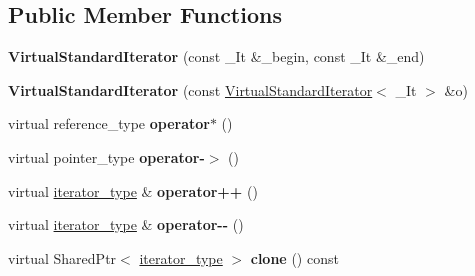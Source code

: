\subsection*{Public Member Functions}
\begin{DoxyCompactItemize}
\item 
{\bfseries Virtual\+Standard\+Iterator} (const \+\_\+\+It \&\+\_\+begin, const \+\_\+\+It \&\+\_\+end)\hypertarget{classAudio_1_1VirtualStandardIterator_a237655dc55ce904e05ee19234c190e04}{}\label{classAudio_1_1VirtualStandardIterator_a237655dc55ce904e05ee19234c190e04}

\item 
{\bfseries Virtual\+Standard\+Iterator} (const \hyperlink{classAudio_1_1VirtualStandardIterator}{Virtual\+Standard\+Iterator}$<$ \+\_\+\+It $>$ \&o)\hypertarget{classAudio_1_1VirtualStandardIterator_a5cd290b2dc2c82f4f6ab9119bc964a4d}{}\label{classAudio_1_1VirtualStandardIterator_a5cd290b2dc2c82f4f6ab9119bc964a4d}

\item 
virtual reference\+\_\+type {\bfseries operator$\ast$} ()\hypertarget{classAudio_1_1VirtualStandardIterator_af8d67f959d9957d33e445b3fed16312b}{}\label{classAudio_1_1VirtualStandardIterator_af8d67f959d9957d33e445b3fed16312b}

\item 
virtual pointer\+\_\+type {\bfseries operator-\/$>$} ()\hypertarget{classAudio_1_1VirtualStandardIterator_a0c93dbfb274b2e1aeddcfdb36cbb28fb}{}\label{classAudio_1_1VirtualStandardIterator_a0c93dbfb274b2e1aeddcfdb36cbb28fb}

\item 
virtual \hyperlink{classAudio_1_1VirtualIterator}{iterator\+\_\+type} \& {\bfseries operator++} ()\hypertarget{classAudio_1_1VirtualStandardIterator_a6b4d90f8a8e0ba3285c9c4c3d9a0a67f}{}\label{classAudio_1_1VirtualStandardIterator_a6b4d90f8a8e0ba3285c9c4c3d9a0a67f}

\item 
virtual \hyperlink{classAudio_1_1VirtualIterator}{iterator\+\_\+type} \& {\bfseries operator-\/-\/} ()\hypertarget{classAudio_1_1VirtualStandardIterator_a7bf581354dd79f7bd3e0de7b0a243828}{}\label{classAudio_1_1VirtualStandardIterator_a7bf581354dd79f7bd3e0de7b0a243828}

\item 
virtual Shared\+Ptr$<$ \hyperlink{classAudio_1_1VirtualIterator}{iterator\+\_\+type} $>$ {\bfseries clone} () const \hypertarget{classAudio_1_1VirtualStandardIterator_a6d4fd268f290b31f405203e2452cce05}{}\label{classAudio_1_1VirtualStandardIterator_a6d4fd268f290b31f405203e2452cce05}


\end{DoxyCompactItemize}
